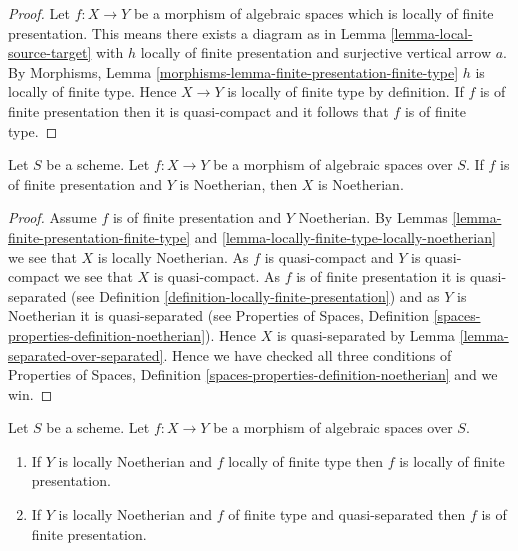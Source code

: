 \begin{proof}
Let $f : X \to Y$ be a morphism of algebraic spaces which is locally of
finite presentation. This means there exists a diagram as in
Lemma \ref{lemma-local-source-target}
with $h$ locally of finite presentation and surjective vertical arrow $a$. By
Morphisms, Lemma \ref{morphisms-lemma-finite-presentation-finite-type}
$h$ is locally of finite type.
Hence $X \to Y$ is locally of finite type by definition.
If $f$ is of finite presentation then it is quasi-compact and
it follows that $f$ is of finite type.
\end{proof}

\begin{lemma}
\label{lemma-finite-presentation-noetherian}
Let $S$ be a scheme.
Let $f : X \to Y$ be a morphism of algebraic spaces over $S$.
If $f$ is of finite presentation and $Y$ is Noetherian,
then $X$ is Noetherian.
\end{lemma}

\begin{proof}
Assume $f$ is of finite presentation and $Y$ Noetherian. By
Lemmas \ref{lemma-finite-presentation-finite-type} and
\ref{lemma-locally-finite-type-locally-noetherian}
we see that $X$ is locally Noetherian. As $f$ is quasi-compact
and $Y$ is quasi-compact we see that $X$ is quasi-compact.
As $f$ is of finite presentation it is quasi-separated (see
Definition \ref{definition-locally-finite-presentation})
and as $Y$ is Noetherian it is quasi-separated (see
Properties of Spaces,
Definition \ref{spaces-properties-definition-noetherian}).
Hence $X$ is quasi-separated by
Lemma \ref{lemma-separated-over-separated}.
Hence we have checked all three conditions of
Properties of Spaces,
Definition \ref{spaces-properties-definition-noetherian}
and we win.
\end{proof}

\begin{lemma}
\label{lemma-noetherian-finite-type-finite-presentation}
Let $S$ be a scheme.
Let $f : X \to Y$ be a morphism of algebraic spaces over $S$.
\begin{enumerate}
\item If $Y$ is locally Noetherian and $f$ locally of finite type
then $f$ is locally of finite presentation.
\item If $Y$ is locally Noetherian and $f$ of finite type and quasi-separated
then $f$ is of finite presentation.
\end{enumerate}
\end{lemma}

